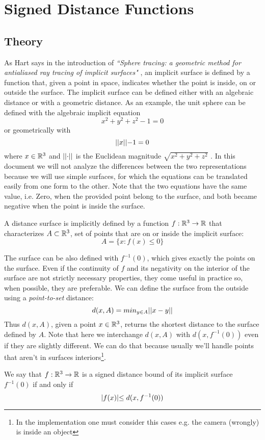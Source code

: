 
\section{Signed Distance Functions}
\subsection{Theory}
As Hart says in the introduction of
\emph{``Sphere tracing: a geometric method for antialiased ray tracing of implicit surfaces"}
\cite{hart1996}, an implicit surface is defined by a function that, given a point in space, indicates whether the point is inside, on or outside the surface.
The implicit surface can be defined either with an algebraic distance or with a geometric distance.
As an example, the unit sphere can be defined with the algebraic implicit equation
$$ x^2 + y^2 + z^2 - 1 = 0 $$
or geometrically with
$$ \lvert\lvert x \lvert\lvert - 1= 0 $$
where $x \in \mathbb{R}^3$ and $\lvert\lvert \cdot \lvert\lvert$ is the Euclidean magnitude $\sqrt{x^2 + y^2 + z^2}$
.
In this document we will not analyze the differences between the two representations because we will use simple surfaces, for which the equations can be translated easily from one form to the other.
Note that the two equations have the same value, i.e. Zero, when the provided point belong to the surface, and both became negative when the point is inside the surface.
\begin{definition}
  A distance surface is implicitly defined by a function 
$f : \mathbb{R}^3 \to \mathbb{R}$ that characterizes $A \subset \mathbb{R}^3$, set of points that are on or inside the implicit surface:
$$ A = \{ x: f(x) \leq 0\} $$
\end{definition}
\noindent
The surface can be also defined with $f^{-1}(0)$, which gives exactly the points on the surface.
Even if the continuity of $f$ and its negativity on the interior of the surface are not strictly necessary properties, they come useful in practice so, when possible, they are preferable.
We can define the surface from the outside using a \emph{point-to-set} distance:
$$
d(x,A) = min_{y \in A} \lvert\lvert x - y \lvert\lvert
$$
Thus $d(x,A)$, given a point $x \in \mathbb{R}^3$, returns the shortest distance to the surface defined by $A$.
Note that here we interchange $d(x,A)$ with $d(x, f^{-1}(0))$ even if they are slightly different.
We can do that because usually we'll handle points that aren't in surfaces interiors\footnote{
  In the implementation one must consider this cases e.g. the camera (wrongly) is inside an object
}.
\begin{definition}
We say that $f: \mathbb{R}^3 \to \mathbb{R}$ is a signed distance bound of its implicit surface $f^{-1}(0)$ if and only if
\begin{equation}\label{eq:sdb}
\lvert f(x) \lvert \leq d(x,f^{-1}(0))
\end{equation}
\end{definition}

